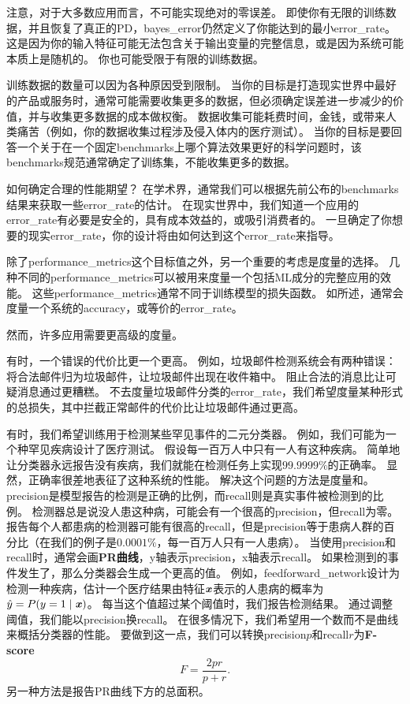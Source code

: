 注意，对于大多数应用而言，不可能实现绝对的零误差。
即使你有无限的训练数据，并且恢复了真正的\gls{PD}，\gls{bayes_error}仍然定义了你能达到的最小\gls{error_rate}。
这是因为你的输入特征可能无法包含关于输出变量的完整信息，或是因为系统可能本质上是随机的。
你也可能受限于有限的训练数据。

训练数据的数量可以因为各种原因受到限制。
当你的目标是打造现实世界中最好的产品或服务时，通常可能需要收集更多的数据，但必须确定误差进一步减少的价值，并与收集更多数据的成本做权衡。
数据收集可能耗费时间，金钱，或带来人类痛苦（例如，你的数据收集过程涉及侵入体内的医疗测试）。
当你的目标是要回答一个关于在一个固定\gls{benchmarks}上哪个算法效果更好的科学问题时，该\gls{benchmarks}规范通常确定了训练集，不能收集更多的数据。


如何确定合理的性能期望？
在学术界，通常我们可以根据先前公布的\gls{benchmarks}结果来获取一些\gls{error_rate}的估计。
在现实世界中，我们知道一个应用的\gls{error_rate}有必要是安全的，具有成本效益的，或吸引消费者的。
一旦确定了你想要的现实\gls{error_rate}，你的设计将由如何达到这个\gls{error_rate}来指导。

除了\gls{performance_metrics}这个目标值之外，另一个重要的考虑是度量的选择。
几种不同的\gls{performance_metrics}可以被用来度量一个包括\gls{ML}成分的完整应用的效能。
这些\gls{performance_metrics}通常不同于训练模型的损失函数。 
如所述，通常会度量一个系统的\gls{accuracy}，或等价的\gls{error_rate}。

然而，许多应用需要更高级的度量。

有时，一个错误的代价比更一个更高。
例如，垃圾邮件检测系统会有两种错误：将合法邮件归为垃圾邮件，让垃圾邮件出现在收件箱中。
阻止合法的消息比让可疑消息通过更糟糕。
不去度量垃圾邮件分类的\gls{error_rate}，我们希望度量某种形式的总损失，其中拦截正常邮件的代价比让垃圾邮件通过更高。

有时，我们希望训练用于检测某些罕见事件的二元分类器。
例如，我们可能为一个种罕见疾病设计了医疗测试。
假设每一百万人中只有一人有这种疾病。
简单地让分类器永远报告没有疾病，我们就能在检测任务上实现$99.9999\%$的正确率。
显然，正确率很差地表征了这种系统的性能。
解决这个问题的方法是度量和。
\gls{precision}是模型报告的检测是正确的比例，而\gls{recall}则是真实事件被检测到的比例。
检测器总是说没人患这种病，可能会有一个很高的\gls{precision}，但\gls{recall}为零。
报告每个人都患病的检测器可能有很高的\gls{recall}，但是\gls{precision}等于患病人群的百分比（在我们的例子是$0.0001\%$，每一百万人只有一人患病）。
当使用\gls{precision}和\gls{recall}时，通常会画\textbf{PR曲线}，y轴表示\gls{precision}，x轴表示\gls{recall}。
如果检测到的事件发生了，那么分类器会生成一个更高的值。
例如，\gls{feedforward_network}设计为检测一种疾病，估计一个医疗结果由特征$\boldsymbol{\mathit{x}}$表示的人患病的概率为$\hat{y} = P(y=1\mid\boldsymbol{\mathit{x}})$。
每当这个值超过某个阈值时，我们报告检测结果。
通过调整阈值，我们能以\gls{precision}换\gls{recall}。
在很多情况下，我们希望用一个数而不是曲线来概括分类器的性能。
要做到这一点，我们可以转换\gls{precision}$p$和\gls{recall}$r$为\textbf{F-score}
\begin{equation}
	F = \frac{2pr}{p+r}.
\end{equation}
另一种方法是报告PR曲线下方的总面积。

